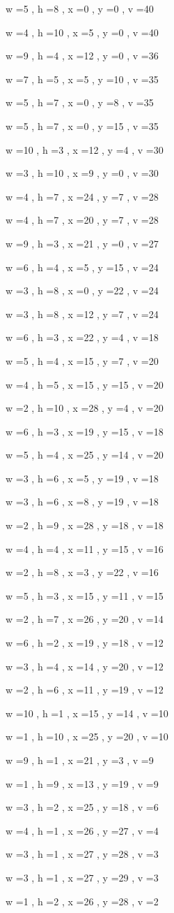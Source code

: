 \documentclass[11pt]{article}
\begin{document}
w =5 , h =8 , x =0 , y =0 , v =40
\par
w =4 , h =10 , x =5 , y =0 , v =40
\par
w =9 , h =4 , x =12 , y =0 , v =36
\par
w =7 , h =5 , x =5 , y =10 , v =35
\par
w =5 , h =7 , x =0 , y =8 , v =35
\par
w =5 , h =7 , x =0 , y =15 , v =35
\par
w =10 , h =3 , x =12 , y =4 , v =30
\par
w =3 , h =10 , x =9 , y =0 , v =30
\par
w =4 , h =7 , x =24 , y =7 , v =28
\par
w =4 , h =7 , x =20 , y =7 , v =28
\par
w =9 , h =3 , x =21 , y =0 , v =27
\par
w =6 , h =4 , x =5 , y =15 , v =24
\par
w =3 , h =8 , x =0 , y =22 , v =24
\par
w =3 , h =8 , x =12 , y =7 , v =24
\par
w =6 , h =3 , x =22 , y =4 , v =18
\par
w =5 , h =4 , x =15 , y =7 , v =20
\par
w =4 , h =5 , x =15 , y =15 , v =20
\par
w =2 , h =10 , x =28 , y =4 , v =20
\par
w =6 , h =3 , x =19 , y =15 , v =18
\par
w =5 , h =4 , x =25 , y =14 , v =20
\par
w =3 , h =6 , x =5 , y =19 , v =18
\par
w =3 , h =6 , x =8 , y =19 , v =18
\par
w =2 , h =9 , x =28 , y =18 , v =18
\par
w =4 , h =4 , x =11 , y =15 , v =16
\par
w =2 , h =8 , x =3 , y =22 , v =16
\par
w =5 , h =3 , x =15 , y =11 , v =15
\par
w =2 , h =7 , x =26 , y =20 , v =14
\par
w =6 , h =2 , x =19 , y =18 , v =12
\par
w =3 , h =4 , x =14 , y =20 , v =12
\par
w =2 , h =6 , x =11 , y =19 , v =12
\par
w =10 , h =1 , x =15 , y =14 , v =10
\par
w =1 , h =10 , x =25 , y =20 , v =10
\par
w =9 , h =1 , x =21 , y =3 , v =9
\par
w =1 , h =9 , x =13 , y =19 , v =9
\par
w =3 , h =2 , x =25 , y =18 , v =6
\par
w =4 , h =1 , x =26 , y =27 , v =4
\par
w =3 , h =1 , x =27 , y =28 , v =3
\par
w =3 , h =1 , x =27 , y =29 , v =3
\par
w =1 , h =2 , x =26 , y =28 , v =2
\par
\newpage
\end{document}
